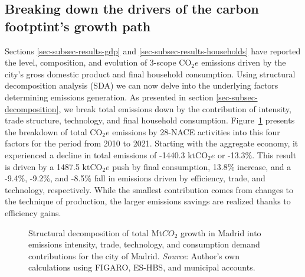 \documentclass[
  10pt,
  twocolumn]{aft}
\begin{document}
\subsection{Breaking down the drivers of the carbon footptint's growth
path}\label{sec-decomposition-simulation}

Sections \ref{sec-subsec-results-gdp} and
\ref{sec-subsec-results-households} have reported the level,
composition, and evolution of 3-scope \(\text{CO}_2e\) emissions driven
by the city's gross domestic product and final household consumption.
Using structural decomposition analysis (SDA) we can now delve into the
underlying factors determining emissions generation. As presented in
section \ref{sec-subsec-decomposition}, we break total emissions down by
the contribution of intensity, trade structure, technology, and final
household consumption. Figure~\ref{fig-sda-decomposition} presents the
breakdown of total \(\text{CO}_2e\) emissions by 28-NACE activities into
this four factors for the period from 2010 to 2021. Starting with the
aggregate economy, it experienced a decline in total emissions of
-1440.3 \(\text{ktCO}_2e\) or -13.3\%. This result is driven by a 1487.5
\(\text{ktCO}_2e\) push by final consumption, 13.8\% increase, and a
-9.4\%, -9.2\%, and -8.5\% fall in emissions driven by efficiency,
trade, and technology, respectively. While the smallest contribution
comes from changes to the technique of production, the larger emissions
savings are realized thanks to efficiency gains.

\begin{figure}


\caption{\label{fig-sda-decomposition}Structural decomposition of total
Mt\(CO_2\) growth in Madrid into emissions intensity, trade, technology,
and consumption demand contributions for the city of Madrid.
\emph{Source}: Author's own calculations using FIGARO, ES-HBS, and
municipal accounts.}

\end{figure}%
\end{document}
